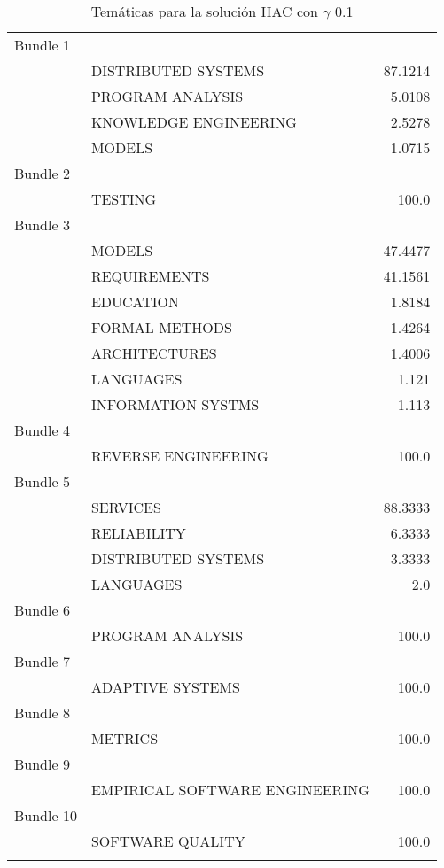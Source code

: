 \begin{center}
\begin{longtable}{|llr|}
    \hline
    Bundle 1 & ~ & ~ \\
 ~ & DISTRIBUTED SYSTEMS & 87.1214 \\
 ~ & PROGRAM ANALYSIS & 5.0108 \\
 ~ & KNOWLEDGE ENGINEERING & 2.5278 \\
 ~ & MODELS & 1.0715 \\
Bundle 2 & ~ & ~ \\
 ~ & TESTING & 100.0 \\
Bundle 3 & ~ & ~ \\
 ~ & MODELS & 47.4477 \\
 ~ & REQUIREMENTS & 41.1561 \\
 ~ & EDUCATION & 1.8184 \\
 ~ & FORMAL METHODS & 1.4264 \\
 ~ & ARCHITECTURES & 1.4006 \\
 ~ & LANGUAGES & 1.121 \\
 ~ & INFORMATION SYSTMS & 1.113 \\
Bundle 4 & ~ & ~ \\
 ~ & REVERSE ENGINEERING & 100.0 \\
Bundle 5 & ~ & ~ \\
 ~ & SERVICES & 88.3333 \\
 ~ & RELIABILITY & 6.3333 \\
 ~ & DISTRIBUTED SYSTEMS & 3.3333 \\
 ~ & LANGUAGES & 2.0 \\
Bundle 6 & ~ & ~ \\
 ~ & PROGRAM ANALYSIS & 100.0 \\
Bundle 7 & ~ & ~ \\
 ~ & ADAPTIVE SYSTEMS & 100.0 \\
Bundle 8 & ~ & ~ \\
 ~ & METRICS & 100.0 \\
Bundle 9 & ~ & ~ \\
 ~ & EMPIRICAL SOFTWARE ENGINEERING & 100.0 \\
Bundle 10 & ~ & ~ \\
 ~ & SOFTWARE QUALITY & 100.0 \\
    \hline
  \caption {Temáticas para la solución HAC con $\gamma$ 0.1}
\end{longtable}
\end{center}

